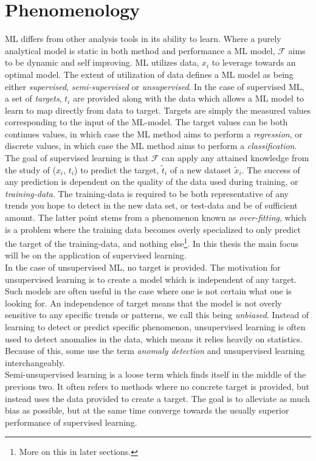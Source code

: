 \section{Phenomenology}
\ac{ML} differs from other analysis tools in its ability to
learn. Where a purely analytical model is static in both method 
and performance a \ac{ML} model, $\mathcal{F}$ aims to be dynamic and self 
improving. \ac{ML} utilizes data, $x_i$ to leverage towards an optimal
model. The extent of utilization of data defines a \ac{ML} model as being
either \emph{supervised}, \emph{semi-supervised} or \emph{unsupervised}. In the case 
of supervised \ac{ML}, a set of \emph{targets}, $t_i$ are provided along with the
data which allows a \ac{ML} model to learn to map directly from data to target. Targets
are simply the measured values corresponding to the input of the \ac{ML}-model. The target
values can be both continues values, in which case the \ac{ML} method aims to perform a \emph{regression},
or discrete values, in which case the \ac{ML} method aims to perform a \emph{classification}. 
\\
The goal of supervised learning is that $\mathcal{F}$ can apply any attained knowledge from 
the study of ($x_i$, $t_i$) to predict the target, $\tilde{t}_i$ of a new dataset
$\tilde{x}_i$. The success of any prediction is dependent on the quality of the 
data used during training, or \emph{training-data}. The training-data is required to 
be both representative of any trends you hope to detect in the new data set, or test-data
and be of sufficient amount. The latter point stems from a phenomenon known as \emph{over-fitting},
which is a problem where the training data becomes overly specialized to only predict 
the target of the training-data, and nothing else\footnote{More on this in later sections.}.
In this thesis the main focus will be on the application of supervised learning.
\\
In the case of unsupervised \ac{ML}, no target is provided. The motivation for unsupervised
learning is to create a model which is independent of any target. Such models are often 
useful in the case where one is not certain what one is looking for. An independence of target
means that the model is not overly sensitive to any specific trends or patterns, we call
this being \emph{unbiased}. Instead of learning to detect or predict specific phenomenon,
unsupervised learning is often used to detect anomalies in the data, which means it relies
heavily on statistics. Because of this, some use the term \emph{anomaly detection} and 
unsupervised learning interchangeably.
\\
 Semi-unsupervised learning is a loose term
which finds itself in the middle of the previous two. It often refers to methods where 
no concrete target is provided, but instead uses the data provided to create a target. The goal 
is to alleviate as much bias as possible, but at the same time converge towards the usually 
superior performance of supervised learning.  
